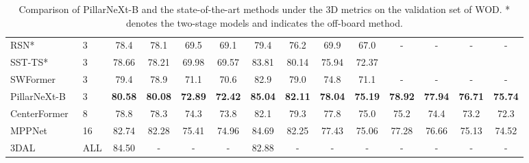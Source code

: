\documentclass[10pt,twocolumn,letterpaper]{article}
\begin{document}
\begin{table*}[]
\begin{tabular}{l|l|cc|cc|cc|cc|cc|cc}
RSN*~\cite{sun2021rsn} & 3 & 78.4 & 78.1 &  69.5 & 69.1 & 79.4 & 76.2 & 69.9 & 67.0 & - & - & - & - \\ 
SST-TS*~\cite{fan2022embracing} & 3 & 78.66 & 78.21 & 69.98 & 69.57 & 83.81 & 80.14 & 75.94 & 72.37  & & & \\
SWFormer~\cite{sun2022swformer} & 3 & 79.4 & 78.9  & 71.1 & 70.6 &   82.9 & 79.0  & 74.8 &  71.1  & - & - & - & -  \\  PillarNeXt-B &  3 & \textbf{80.58} & \textbf{80.08} & \textbf{72.89} & \textbf{72.42} & \textbf{85.04} & \textbf{82.11} & \textbf{78.04} & \textbf{75.19} &  \textbf{78.92} & \textbf{77.94} & \textbf{76.71} & \textbf{75.74} \\ \hline
CenterFormer~\cite{zhou2022centerformer} & 8 & 78.8  & 78.3   & 74.3  & 73.8  &  82.1  & 79.3   & 77.8  & 75.0   & 75.2  & 74.4   & 73.2  & 72.3 \\
MPPNet~\cite{chen2022mppnet} & 16 & 82.74 & 82.28 &  75.41 & 74.96  & 84.69 & 82.25  &  77.43 & 75.06  & 77.28 & 76.66 &  75.13 & 74.52  \\
3DAL~\cite{qi2021offboard} & ALL  & 84.50 & - & - & - & 82.88 & - & - & -  & - & - & -  & -  \\ 
 \hline
\end{tabular}
\vspace{-2mm}
\caption{Comparison of PillarNeXt-B and the state-of-the-art methods under the 3D metrics on the validation set of WOD. * denotes the two-stage models and  indicates the off-board method.}
\vspace{-1mm}
\label{tab:waymo-sota}
\end{table*}
\end{document}
